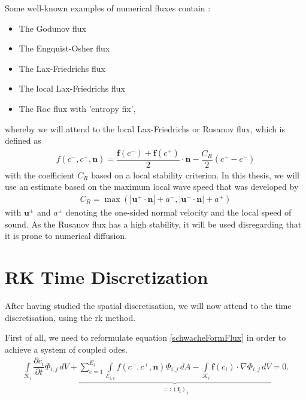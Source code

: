 		Some well-known examples of numerical fluxes contain \cite{Cockburn1998}:
		\begin{itemize}
			\item The Godunov flux 
			\item The Engquist-Osher flux
			\item The Lax-Friedrichs flux
			\item The local Lax-Friedrichs flux
			\item The Roe flux with 'entropy fix',
		\end{itemize}
		whereby we will attend to the local Lax-Friedrichs or Rusanov flux, which is defined as
		\begin{align}
			f(c^-, c^+, \mathbf{n}) = \dfrac{\mathbf{f}(c^-)+\mathbf{f}(c^+)}{2} \cdot \mathbf{n} -\dfrac{C_R}{2}(c^+-c^-)
		\end{align}
		with the coefficient $C_R$ based on a local stability criterion. In this thesis, we will use an estimate based on the maximum local wave speed that was developed by \textcite{tororiemann}
		\begin{align}
			C_R = \max(|\mathbf{u^+}\cdot \mathbf{n}|+a^-,|\mathbf{u^-}\cdot \mathbf{n}|+a^+)
		\end{align}
		with $\mathbf{u^\pm}$ and $a^\pm$ denoting the one-sided normal velocity and the local speed of sound.
		As the Rusanov flux has a high stability, it will be used disregarding that it is prone to numerical diffusion.
	\section{RK Time Discretization}
	After having studied the spatial discretisation, we will now attend to the time discretisation, using the \gls{rk} method.\\\indent

	First of all, we need to reformulate equation \eqref{schwacheFormFlux} in order to achieve a system of coupled \glspl{ode}.
	\begin{align*}
		\int\limits_{\mathcal{K}_i} \dfrac{\partial c_i}{\partial t}\Phi_{i,j} \, dV +
		\underbrace{\sum_{e=1}^{E_i}\int\limits_{\mathcal{E}_{i,e}} f \left( c^-, c^+, \mathbf{n} \right) \Phi_{i,j} \, dA - \int\limits_{\mathcal{K}_i} \boldsymbol{f}\left(c_i\right) \cdot \nabla\Phi_{i,j} \, dV}_{=:(\mathbf{f_i})_j} = 0.
	\end{align*}
	
